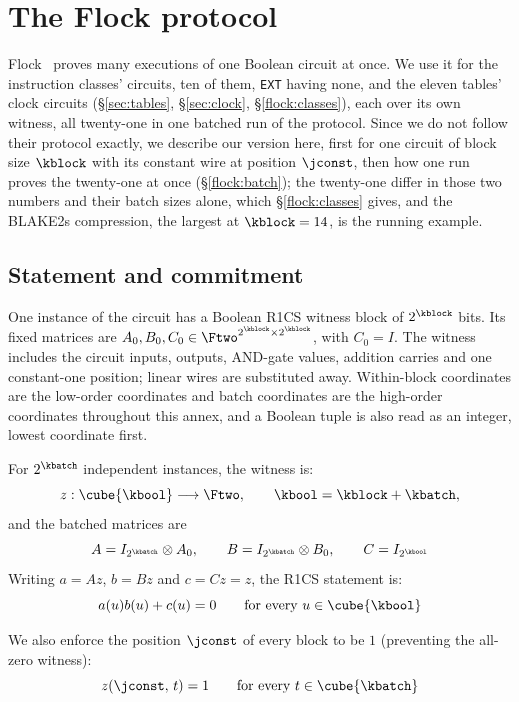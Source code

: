 \section{The Flock protocol}\label{annex:flock}

Flock~\cite{Flock26} proves many executions of one Boolean circuit at once. We use it for the instruction classes' circuits, ten of them, \texttt{EXT} having none, and the eleven tables' clock circuits (\S\ref{sec:tables}, \S\ref{sec:clock}, \S\ref{flock:classes}), each over its own witness, all twenty-one in one batched run of the protocol. Since we do not follow their protocol exactly, we describe our version here, first for one circuit of block size $\kblock$ with its constant wire at position $\jconst$, then how one run proves the twenty-one at once (\S\ref{flock:batch}); the twenty-one differ in those two numbers and their batch sizes alone, which \S\ref{flock:classes} gives, and the BLAKE2s compression, the largest at $\kblock=14$, is the running example.

\subsection{Statement and commitment}\label{flock:statement}

One instance of the circuit has a Boolean R1CS witness block of $2^{\kblock}$ bits. Its fixed matrices are $A_0,B_0,C_0\in\Ftwo^{2^{\kblock}\times 2^{\kblock}}$, with $C_0=I$. The witness includes the circuit inputs, outputs, AND-gate values, addition carries and one constant-one position; linear wires are substituted away. Within-block coordinates are the low-order coordinates and batch coordinates are the high-order coordinates throughout this annex, and a Boolean tuple is also read as an integer, lowest coordinate first.

For $2^{\kbatch}$ independent instances, the witness is:
\[
z:\cube{\kbool}\longrightarrow\Ftwo,\qquad \kbool=\kblock+\kbatch,
\]
and the batched matrices are
\[
A=I_{2^{\kbatch}}\otimes A_0,\qquad B=I_{2^{\kbatch}}\otimes B_0,\qquad C=I_{2^{\kbool}}
\]
Writing $a=Az$, $b=Bz$ and $c=Cz=z$, the R1CS statement is:
\begin{equation}\label{flock:eq:r1cs}
a(u)b(u)+c(u)=0\qquad\text{for every }u\in\cube{\kbool}
\end{equation}

We also enforce the position $\jconst$ of every block to be $1$ (preventing the all-zero witness):
\begin{equation}\label{flock:eq:const-one}
z(\jconst,\,t)=1\qquad\text{for every }t\in\cube{\kbatch}
\end{equation}

